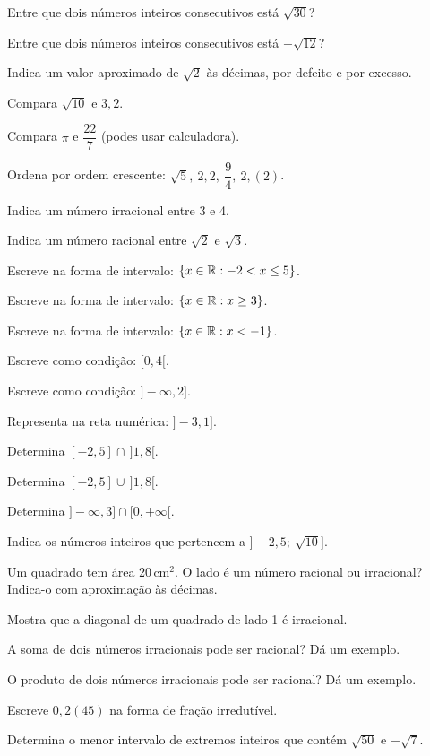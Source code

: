 \documentclass[12pt]{article}
\begin{document}
\begin{exercicios}
  \item Entre que dois números inteiros consecutivos está $\sqrt{30}$?
  \item Entre que dois números inteiros consecutivos está $-\sqrt{12}$?
  \item Indica um valor aproximado de $\sqrt{2}$ às décimas, por defeito e por excesso.
  \item Compara $\sqrt{10}$ e $3{,}2$.
  \item Compara $\pi$ e $\dfrac{22}{7}$ (podes usar calculadora).
  \item Ordena por ordem crescente: $\sqrt{5},\ 2{,}2,\ \dfrac{9}{4},\ 2{,}(2)$.
  \item Indica um número irracional entre 3 e 4.
  \item Indica um número racional entre $\sqrt{2}$ e $\sqrt{3}$.
\end{exercicios}

\begin{exercicios}
  \item Escreve na forma de intervalo: $\{x \in \mathbb{R} : -2 < x \le 5\}$.
  \item Escreve na forma de intervalo: $\{x \in \mathbb{R} : x \ge 3\}$.
  \item Escreve na forma de intervalo: $\{x \in \mathbb{R} : x < -1\}$.
  \item Escreve como condição: $[0, 4[$.
  \item Escreve como condição: $]-\infty, 2]$.
  \item Representa na reta numérica: $]-3, 1]$.
  \item Determina $[-2, 5] \cap\, ]1, 8[$.
  \item Determina $[-2, 5] \cup\, ]1, 8[$.
  \item Determina $]-\infty, 3] \cap [0, +\infty[$.
  \item Indica os números inteiros que pertencem a $]-2{,}5;\ \sqrt{10}]$.
\end{exercicios}

\begin{exercicios}
  \item Um quadrado tem área 20\,cm$^2$. O lado é um número racional ou irracional? Indica-o com aproximação às décimas.
  \item Mostra que a diagonal de um quadrado de lado 1 é irracional.
  \item A soma de dois números irracionais pode ser racional? Dá um exemplo.
  \item O produto de dois números irracionais pode ser racional? Dá um exemplo.
  \item Escreve $0{,}2(45)$ na forma de fração irredutível.
  \item Determina o menor intervalo de extremos inteiros que contém $\sqrt{50}$ e $-\sqrt{7}$.
\end{exercicios}
\end{document}
